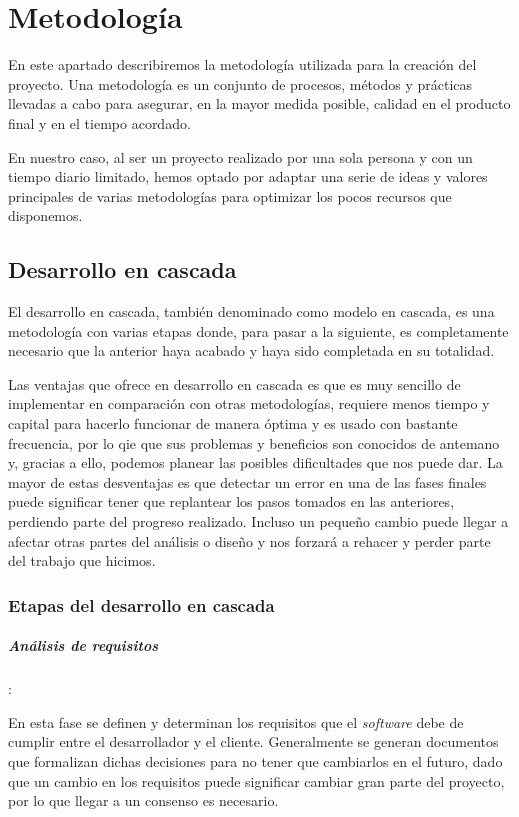 \chapter{Metodología}

En este apartado describiremos la metodología utilizada para la creación del proyecto. Una metodología es un conjunto de procesos, métodos y prácticas llevadas a cabo para asegurar, en la mayor medida posible, calidad en el producto final y en el tiempo acordado.

En nuestro caso, al ser un proyecto realizado por una sola persona y con un tiempo diario limitado, hemos optado por adaptar una serie de ideas y valores principales de varias metodologías para optimizar los pocos recursos que disponemos.

\section{Desarrollo en cascada}

El desarrollo en cascada, también denominado como modelo en cascada, es una metodología con varias etapas donde, para pasar a la siguiente, es completamente necesario que la anterior haya acabado y haya sido completada en su totalidad.

Las ventajas que ofrece en desarrollo en cascada es que es muy sencillo de implementar en comparación con otras metodologías, requiere menos tiempo y capital para hacerlo funcionar de manera óptima y es usado con bastante frecuencia, por lo qie que sus problemas y beneficios son conocidos de antemano y, gracias a ello, podemos planear las posibles dificultades que nos puede dar. La mayor de estas desventajas es que detectar un error en una de las fases finales puede significar tener que replantear los pasos tomados en las anteriores, perdiendo parte del progreso realizado. Incluso un pequeño cambio puede llegar a afectar otras partes del análisis o diseño y nos forzará a rehacer y perder parte del trabajo que hicimos. 

\subsection{Etapas del desarrollo en cascada}

\paragraph{Análisis de requisitos}: 

En esta fase se definen y determinan los requisitos que el \textit{software} debe de cumplir entre el desarrollador y el cliente. Generalmente se generan documentos que formalizan dichas decisiones para no tener que cambiarlos en el futuro, dado que un cambio en los requisitos puede significar cambiar gran parte del proyecto, por lo que llegar a un consenso es necesario.

